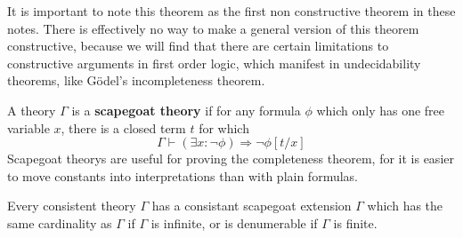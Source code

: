 It is important to note this theorem as the first non constructive theorem in these notes. There is effectively no way to make a general version of this theorem constructive, because we will find that there are certain limitations to constructive arguments in first order logic, which manifest in undecidability theorems, like G\"{o}del's incompleteness theorem.

A theory $\Gamma$ is a {\bf scapegoat theory} if for any formula $\phi$ which only has one free variable $x$, there is a closed term $t$ for which
%
\[ \Gamma \vdash (\exists x: \neg \phi) \Rightarrow \neg \phi[t/x] \]
%
Scapegoat theorys are useful for proving the completeness theorem, for it is easier to move constants into interpretations than with plain formulas.

\begin{lemma}
    Every consistent theory $\Gamma$ has a consistant scapegoat extension $\Gamma$ which has the same cardinality as $\Gamma$ if $\Gamma$ is infinite, or is denumerable if $\Gamma$ is finite.
\end{lemma}
